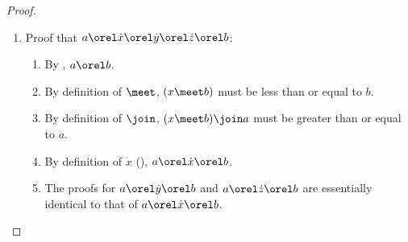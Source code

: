 \begin{proof}
\begin{enumerate}
\begin{enumerate}
\begin{enumerate}
          \item Proof that $a\orel\dot{x}\orel\dot{y}\orel\dot{z}\orel b$:
            \begin{enumerate}
              \item By , $a\orel b$.
              \item By definition of $\meet$, $(x\meet b)$ must be less than or equal to $b$.
              \item By definition of $\join$, $(x\meet b)\join a$ must be greater than or equal to $a$.
              \item By definition of $\dot{x}$ (), $a\orel\dot{x}\orel b$.
              \item The proofs for $a\orel\dot{y}\orel b$ and $a\orel\dot{z}\orel b$ are essentially identical to that of
                    $a\orel\dot{x}\orel b$.
            \end{enumerate}


\end{enumerate}
\end{enumerate}
\end{enumerate}
\end{proof}
